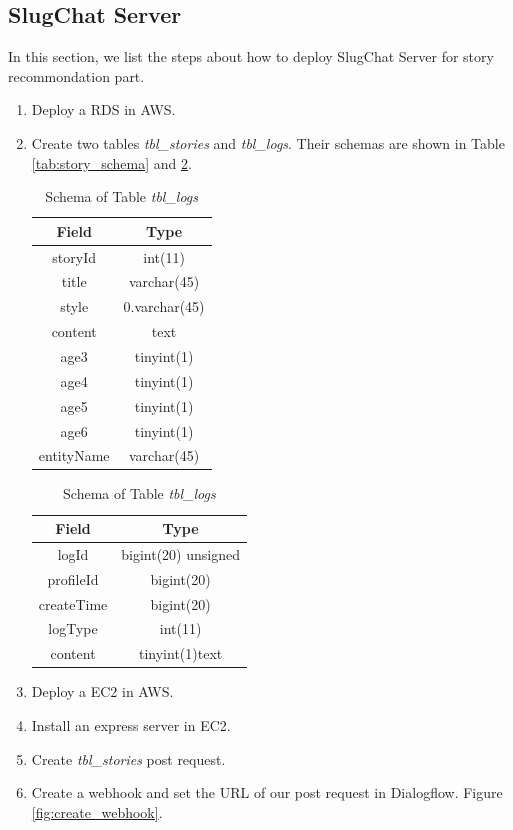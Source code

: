 \documentclass[sigconf]{acmart}
\begin{document}
\subsection{SlugChat Server}
In this section, we list the steps about how to deploy SlugChat Server for story recommondation part.
\begin{enumerate}
\item Deploy a RDS in AWS.
\item Create two tables \emph{tbl\_stories} and \emph{tbl\_logs}. Their schemas are shown in Table \ref{tab:story_schema} and \ref{tab:log_schema}.

\begin{table}
  \caption{Schema of Table \emph{tbl\_stories}}
  \label{tab:story_schema}
  \begin{tabular}{cc}
    \toprule
    Field & Type\\
    \midrule
    storyId & int(11) \\
	title & varchar(45) \\
	style & 0.varchar(45)  \\
	content & text \\
	age3 & tinyint(1) \\
	age4 & tinyint(1) \\
	age5 & tinyint(1) \\
	age6 & tinyint(1) \\
	entityName & varchar(45) \\
  \bottomrule
	\end{tabular}
	\caption{Schema of Table \emph{tbl\_logs}}
  \label{tab:log_schema}
  \begin{tabular}{cc}
    \toprule
    Field & Type\\
    \midrule
    logId & bigint(20) unsigned \\
	profileId & bigint(20) \\
	createTime & bigint(20)  \\
	logType & int(11) \\
	content & tinyint(1)text \\
  \bottomrule
	\end{tabular}
\end{table}
\item Deploy a EC2 in AWS.
\item Install an express server in EC2.
\item Create \emph{tbl\_stories} post request.
\item Create a webhook and set the URL of our post request in Dialogflow. Figure \ref{fig:create_webhook}.

\end{enumerate}
\end{document}
